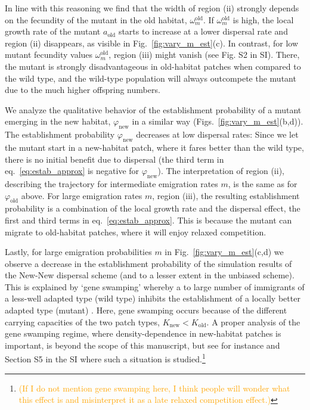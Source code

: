\documentclass[a4paper,11pt]{article}
\newcommand{\pete}[1]{\textcolor{orange}{(#1)}}
\newcommand{\chg}[1]{\textcolor{change}{#1}}
\begin{document}
\chg{In line with this reasoning we find} that the width of region (ii) strongly depends on the fecundity of the mutant in the old habitat, $\omega^\text{old}_m$. If $\omega^\text{old}_m$ is high, the local growth rate of the mutant $a_{\text{old}}$ starts to increase at a lower dispersal rate 
\chg{and }region (ii) disappears, as visible in Fig.~\ref{fig:vary_m_est}(c). In contrast, for low mutant fecundity values $\omega^\text{old}_m$, region (iii) might vanish (see Fig. S2 in SI). There, the mutant is strongly disadvantageous in old-habitat patches when compared to the wild type, and the wild-type population will always outcompete the mutant due to the much higher offspring numbers.

We analyze the qualitative behavior of the establishment probability of a mutant emerging in the new habitat, $\varphi_{\text{new}}$ in a similar way (Figs.~\ref{fig:vary_m_est}(b,d)). The establishment probability $\varphi_{\text{new}}$ decreases at low dispersal rates: Since we let the mutant start in a new-habitat patch, where it fares better than the wild type, there is no initial benefit due to dispersal (the third term in eq.~\eqref{eq:estab_approx} is negative for $\varphi_{\text{new}}$). The interpretation of region (ii), describing the trajectory for intermediate emigration rates $m$, is the same as for $\varphi_{\text{old}}$ above. For large emigration rates $m$, region (iii), the resulting establishment probability is a combination of the local growth rate and the dispersal effect, the first and third terms in eq.~\eqref{eq:estab_approx}. This is because the mutant can migrate to old-habitat patches, where it will enjoy relaxed competition. %

\chg{Lastly, for large emigration probabilities $m$ in Fig.~\ref{fig:vary_m_est}(c,d) we observe a decrease in the establishment probability of the simulation results of the New-New dispersal scheme (and to a lesser extent in the unbiased scheme). This is explained by `gene swamping' whereby a to large number of immigrants of a less-well adapted type (wild type) inhibits the establishment of a locally better adapted type (mutant) \citep{nagylaki_1978,lenormand_2002}. Here, gene swamping occurs because of the different carrying capacities of the two patch types, $K_{\text{new}}<K_{\text{old}}$. A proper analysis of the gene swamping regime, where density-dependence in new-habitat patches is important, is beyond the scope of this manuscript, but see for instance \citet{tomasini_2018} and Section S5 in the SI where such a situation is studied.}\footnote{\pete{If I do not mention gene swamping here, I think people will wonder what this effect is and misinterpret it as a late relaxed competition effect.}}
\end{document}
